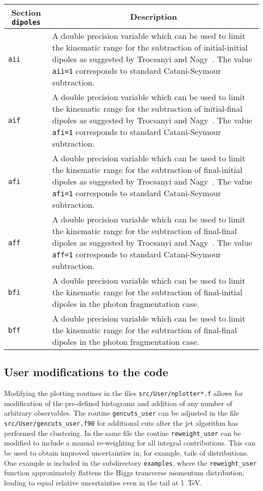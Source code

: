 	\begin{longtable}{p{1.5cm}p{12cm}}
		\toprule
		\multicolumn{1}{c}{{\textbf{Section} \texttt{dipoles}}} & \multicolumn{1}{c}{{\textbf{Description}}} \\ 
		\midrule
		{\tt aii} &
		A double precision variable which can be used to
		limit the kinematic range for the subtraction of initial-initial dipoles
		as suggested by Trocsanyi and Nagy~\cite{Nagy:2003tz}.   
		The value {\tt aii=1} corresponds 
		to standard Catani-Seymour subtraction.\\
		{\tt aif} &
		A double precision variable which can be used to
		limit the kinematic range for the subtraction of initial-final dipoles
		as suggested by Trocsanyi and Nagy~\cite{Nagy:2003tz}.   
		The value {\tt afi=1} corresponds 
		to standard Catani-Seymour subtraction.\\
		{\tt afi} &
		A double precision variable which can be used to
		limit the kinematic range for the subtraction of final-initial dipoles
		as suggested by Trocsanyi and Nagy~\cite{Nagy:2003tz}.   
		The value {\tt afi=1} corresponds 
		to standard Catani-Seymour subtraction.\\
		{\tt aff} &
		A double precision variable which can be used to
		limit the kinematic range for the subtraction of final-final dipoles
		as suggested by Trocsanyi and Nagy~\cite{Nagy:2003tz}.   
		The value {\tt aff=1} corresponds 
		to standard Catani-Seymour subtraction.\\
		{\tt bfi} &
		A double precision variable which can be used to
		limit the kinematic range for the subtraction of final-initial dipoles
		in the photon fragmentation case.\\
		{\tt bff} &
		A double precision variable which can be used to
		limit the kinematic range for the subtraction of final-final dipoles
		in the photon fragmentation case.\\
		\bottomrule
	\end{longtable}

\subsection{User modifications to the code}


Modifying the plotting routines in the files \texttt{src/User/nplotter*.f} allows for modification of the pre-defined 
histograms and addition of any number of arbitrary observables. The routine \texttt{gencuts\_user} can be adjusted  in 
the file
\texttt{src/User/gencuts\_user.f90} for additional cuts after the jet algorithm has performed the 
clustering. In the same file the routine \texttt{reweight\_user} can be modified to include a manual re-weighting
for all integral contributions. This can be used to obtain improved uncertainties in, for example, tails of 
distributions.
One example is included in the subdirectory \texttt{examples}, where the \texttt{reweight\_user} function approximately
flattens the Higgs transverse momentum distribution, leading to equal relative uncertainties even in the tail at 
\SI{1}{TeV}.

